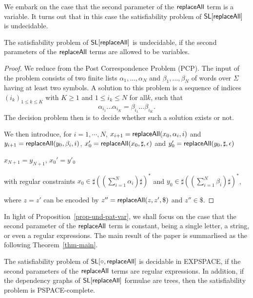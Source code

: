 We embark on the case that the second parameter of the $\mathsf{replaceAll}$ term is a variable. It turns out that in this case the satisfiability problem of $\mathsf{SL}[\mathsf{replaceAll}]$ is undecidable.

\begin{proposition}\label{prop-und-pat-var}
The satisfiability problem of $\mathsf{SL}[\mathsf{replaceAll}]$ is undecidable, if the second parameters of the $\mathsf{replaceAll}$ terms are allowed to be variables.
\end{proposition}

\begin{proof}
	We reduce from the Post Correspondence Problem (PCP). The input of the problem consists of two finite lists $\alpha_{1},\ldots ,\alpha_{N}$ and $\beta_1,\ldots ,\beta_N$ of words over $\Sigma$ having at least two symbols. A solution to this problem is a sequence of indices $(i_{k})_{1\leq k\leq K}$ with $ K\geq 1$ and $ 1\leq i_{k}\leq N$ for all$k$, such that
	\[
	\alpha _{{i_{1}}}\ldots \alpha _{{i_{K}}}=\beta _{{i_{1}}}\ldots \beta _{{i_{K}}}.
	\]
	The decision problem then is to decide whether such a solution exists or not.
	
	We then introduce, for $i=1,\cdots, N$, 
	$x_{i+1}=\mathsf{replaceAll}(x_0, \alpha_i, i)$ and $y_{i+1}=\mathsf{replaceAll}(y_0, \beta_i, i)$, 
	$x_0'=\mathsf{replaceAll}(x_0, \sharp, \epsilon)$ and $y_0'=\mathsf{replaceAll}(y_0, \sharp, \epsilon)$
	
	$x_{N+1}=y_{N+1}$, $x_0'=y'_0$
	
	
	with regular constraints $x_0\in \sharp((\sum_{i=1}^N\alpha_i)\sharp)^*$ and $y_0\in \sharp((\sum_{i=1}^N\beta_i)\sharp)^*$,
	
	where $z=z'$ can be encoded by 
		$z''=\mathsf{replaceAll}(z, z', \$)$ and $z''\in \$$. 
\end{proof}


In light of Proposition~\ref{prop-und-pat-var}, we shall focus on the case that the second parameter of the $\mathsf{replaceAll}$ term is constant, being a single letter, a string, or even a regular expressions. The main result of the paper is summarlised as the following Theorem~\ref{thm-main}.

\begin{theorem}\label{thm-main}
The satisfiability problem of $\mathsf{SL}[\circ, \mathsf{replaceAll}]$ is decidable in EXPSPACE, if the second parameters of the $\mathsf{replaceAll}$ terms are regular expressions. In addition, if the dependency graphs of $\mathsf{SL}[\mathsf{replaceAll}]$ formulae are trees, then the satisfiability problem is PSPACE-complete.
\end{theorem}

